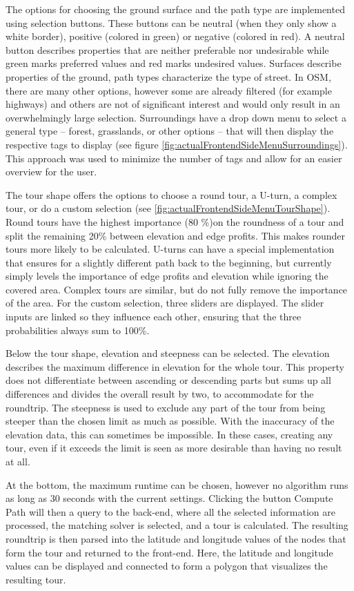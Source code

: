 The options for choosing the ground surface and the path type are implemented using selection buttons.
These buttons can be neutral (when they only show a white border), positive (colored in green) or negative (colored in red). 
A neutral button describes properties that are neither preferable nor undesirable while green marks preferred values and red marks undesired values.
Surfaces describe properties of the ground, path types characterize the type of street.
In OSM, there are many other options, however some are already filtered (for example highways) and others are not of significant interest and would only result in an overwhelmingly large selection.
Surroundings have a drop down menu to select a general type -- forest, grasslands, or other options -- that will then display the respective tags to display (see figure \ref{fig:actualFrontendSideMenuSurroundings}). 
This approach was used to minimize the number of tags and allow for an easier overview for the user.

The tour shape offers the options to choose a round tour, a U-turn, a complex tour, or do a custom selection (see \ref{fig:actualFrontendSideMenuTourShape}). 
Round tours have the highest importance (80 \%)on the roundness of a tour and split the remaining 20\% between elevation and edge profits. 
This makes rounder tours more likely to be calculated.
U-turns can have a special implementation that ensures for a slightly different path back to the beginning, but currently simply levels the importance of edge profits and elevation while ignoring the covered area.
Complex tours are similar, but do not fully remove the importance of the area. 
For the custom selection, three sliders are displayed.
The slider inputs are linked so they influence each other, ensuring that the three probabilities always sum to 100\%.

Below the tour shape, elevation and steepness can be selected. 
The elevation describes the maximum difference in elevation for the whole tour. 
This property does not differentiate between ascending or descending parts but sums up all differences and divides the overall result by two, to accommodate for the roundtrip. 
The steepness is used to exclude any part of the tour from being steeper than the chosen limit as much as possible.
With the inaccuracy of the elevation data, this can sometimes be impossible.
In these cases, creating any tour, even if it exceeds the limit is seen as more desirable than having no result at all.

At the bottom, the maximum runtime can be chosen, however no algorithm runs as long as 30 seconds with the current settings.
Clicking the button \glqq Compute Path\grqq{} will then a query to the back-end, where all the selected information are processed, the matching solver is selected, and a tour is calculated.
The resulting roundtrip is then parsed into the latitude and longitude values of the nodes that form the tour and returned to the front-end.
Here, the latitude and longitude values can be displayed and connected to form a polygon that visualizes the resulting tour.

